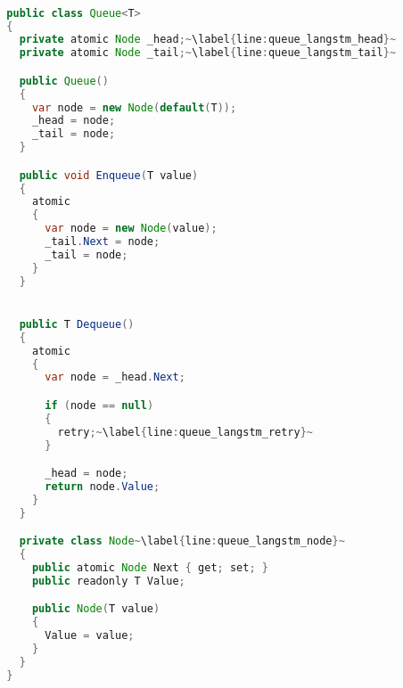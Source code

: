 \begin{lstlisting}[label=lst:impl_dining_lib,
  caption={\stmname Based Concurrent Queue Implementation},
  language=Java,  
  showspaces=false,
  showtabs=false,
  breaklines=true,
  showstringspaces=false,
  breakatwhitespace=true,
  commentstyle=\color{greencomments},
  keywordstyle=\color{bluekeywords},
  stringstyle=\color{redstrings},
  escapechar=~,
  morekeywords={atomic, retry, orelse, var, get, set, ref, out, readonly, virtual, override, region, endregion, foreach, lock}]  % Start your code-block

  public class Queue<T>
  {
    private atomic Node _head;~\label{line:queue_langstm_head}~
    private atomic Node _tail;~\label{line:queue_langstm_tail}~

    public Queue()
    {
      var node = new Node(default(T));
      _head = node;
      _tail = node;
    }

    public void Enqueue(T value)
    {
      atomic
      {
        var node = new Node(value);
        _tail.Next = node;
        _tail = node;
      }
    }


    public T Dequeue()
    {
      atomic
      {
        var node = _head.Next;

        if (node == null)
        {
          retry;~\label{line:queue_langstm_retry}~
        }

        _head = node;
        return node.Value;
      }
    }

    private class Node~\label{line:queue_langstm_node}~
    {
      public atomic Node Next { get; set; }
      public readonly T Value;

      public Node(T value)
      {
        Value = value;
      }
    }
  }

\end{lstlisting}
